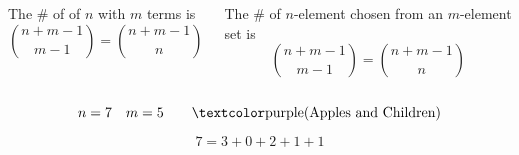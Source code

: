 
\begin{frame}{}
  \begin{columns}
      \begin{theorem}
        The \# of  of $n$ with $m$ terms is
        \[
          {n+m-1 \choose m-1} = {n+m-1 \choose n}
        \]
      \end{theorem}
      \pause
      \begin{theorem}[CS Theorem 1.8]
        The \# of $n$-element  chosen from an $m$-element set is
        \[
          {n+m-1 \choose m-1} = {n+m-1 \choose n}
        \]
      \end{theorem}
  \end{columns}



  \pause
  \[
    n = 7 \quad m = 5 \qquad \text{\purple{(Apples and Children)}}
  \]

  \vspace{-0.30cm}

  \pause
  \vspace{-0.60cm}

  \pause
  \vspace{-0.60cm}
  \[
    7 = 3 + 0 + 2 + 1 + 1
  \]
\end{frame}
